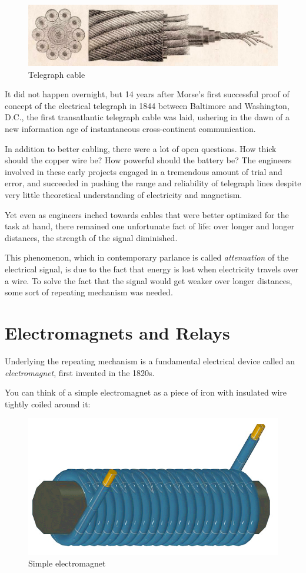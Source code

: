 \documentclass[UTF8]{book}
\begin{document}
\begin{CJK}{UTF8}{gbsn}
\begin{figure}[H]
\centering
\includegraphics[width=0.8\linewidth]{cable-cross-section}
\caption{Telegraph cable}
\end{figure}

It did not happen overnight, but 14 years after Morse's first successful proof of concept of the electrical telegraph in 1844 between Baltimore and Washington, D.C., the first transatlantic telegraph cable was laid, ushering in the dawn of a new information age of instantaneous cross-continent communication.

In addition to better cabling, there were a lot of open questions. How thick should the copper wire be? How powerful should the battery be? The engineers involved in these early projects engaged in a tremendous amount of trial and error, and succeeded in pushing the range and reliability of telegraph lines despite very little theoretical understanding of electricity and magnetism.

Yet even as engineers inched towards cables that were better optimized for the task at hand, there remained one unfortunate fact of life: over longer and longer distances, the strength of the signal diminished.

This phenomenon, which in contemporary parlance is called \emph{attenuation} of the electrical signal, is due to the fact that energy is lost when electricity travels over a wire. To solve the fact that the signal would get weaker over longer distances, some sort of repeating mechanism was needed.

\section{Electromagnets and Relays}

Underlying the repeating mechanism is a fundamental electrical device called an \emph{electromagnet}, first invented in the 1820s.

You can think of a simple electromagnet as a piece of iron with insulated wire tightly coiled around it:

\begin{figure}[H]
\centering
\includegraphics[width=0.8\linewidth]{electromagnet}
\caption{Simple electromagnet}
\end{figure}


\end{CJK}
\end{document}
